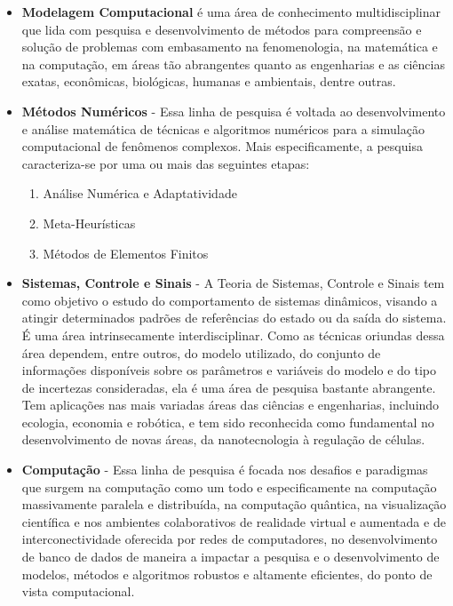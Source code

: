 	\begin{itemize}

		\item \textbf{Modelagem Computacional} é uma área de conhecimento
			multidisciplinar que lida com pesquisa e desenvolvimento de métodos
			para compreensão e solução de problemas com embasamento na
			fenomenologia, na matemática e na computação, em áreas tão
			abrangentes quanto as engenharias e as ciências exatas, econômicas,
			biológicas, humanas e ambientais, dentre outras.

		\item \textbf{Métodos Numéricos} - Essa linha de pesquisa é voltada ao
			desenvolvimento e análise matemática de técnicas e algoritmos
			numéricos para a simulação computacional de fenômenos complexos.
			Mais especificamente, a pesquisa caracteriza-se por uma ou mais das
			seguintes etapas:
			\begin{enumerate}

				\item Análise Numérica e Adaptatividade

				\item Meta-Heurísticas

				\item Métodos de Elementos Finitos

			\end{enumerate}

		\item \textbf{Sistemas, Controle e Sinais} - A Teoria de Sistemas,
			Controle e Sinais tem como objetivo o estudo do comportamento de
			sistemas dinâmicos, visando a atingir determinados padrões de
			referências do estado ou da saída do sistema. É uma área
			intrinsecamente interdisciplinar. Como as técnicas oriundas dessa
			área dependem, entre outros, do modelo utilizado, do conjunto de
			informações disponíveis sobre os parâmetros e variáveis do modelo e
			do tipo de incertezas consideradas, ela é uma área de pesquisa
			bastante abrangente.  Tem aplicações nas mais variadas áreas das
			ciências e engenharias, incluindo ecologia, economia e robótica, e
			tem sido reconhecida como fundamental no desenvolvimento de novas
			áreas, da nanotecnologia à regulação de células.

		\item \textbf{Computação} - Essa linha de pesquisa é focada nos desafios
			e paradigmas que surgem na computação como um todo e especificamente
			na computação massivamente paralela e distribuída, na computação
			quântica, na visualização científica e nos ambientes colaborativos
			de realidade virtual e aumentada e de interconectividade oferecida
			por redes de computadores, no desenvolvimento de banco de dados de
			maneira a impactar a pesquisa e o desenvolvimento de modelos,
			métodos e algoritmos robustos e altamente eficientes, do ponto de
			vista computacional.


\end{itemize}
